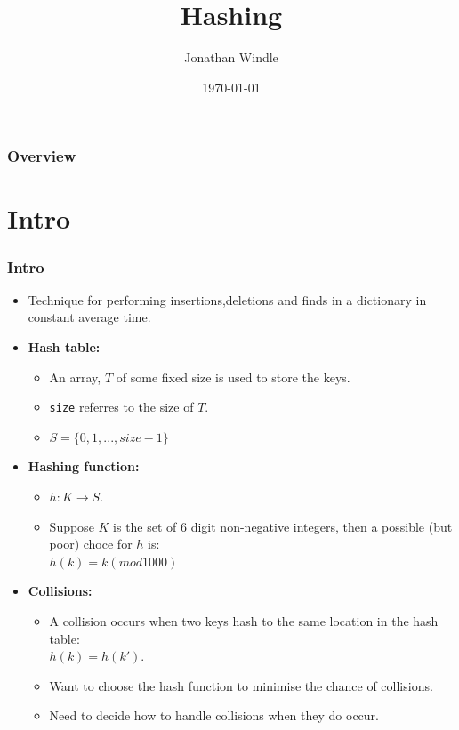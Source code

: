 \documentclass{beamer}
\title[Hashing]{Hashing} %
\author{Jonathan Windle} %
\institute[UEA] %
{
University of East Anglia \\ %
\medskip
\textit{J.Windle@uea.ac.uk} %
}
\date{\today} %
\begin{document}
\begin{frame}
\titlepage %
\end{frame}

\begin{frame}[allowframebreaks]
\frametitle{Overview} %
\tableofcontents %
\end{frame} 

\section{Intro}
\begin{frame}
\frametitle{Intro}
\small
\begin{itemize}
\item Technique for performing insertions,deletions and finds in a dictionary in {\color{green}constant average time}.
\item \textbf{Hash table:}
\begin{itemize}
\small
\item An array, $T$ of some fixed size is  used to store the keys.
\item \texttt{size} referres to the size of $T$.
\item $S = \{0,1,...,size -1\}$
\end{itemize}
\item \textbf{Hashing function:}
\begin{itemize}
\small
\item $h: K \rightarrow S.$
\item Suppose $K$ is the set of 6 digit non-negative integers, then a possible (but poor) choce for $h$ is:\\
\center
$h(k)=k(mod 1000)$
\end{itemize}
\item \textbf{Collisions:}
\begin{itemize}
\small
\item A collision occurs when two keys hash to the same location in the hash table:\\
$h(k) = h(k').$\\
\item Want to choose the hash function to minimise the chance of collisions.
\item Need to decide how to handle collisions when they do occur.
\end{itemize}
\end{itemize}
\end{frame}
\end{document}
